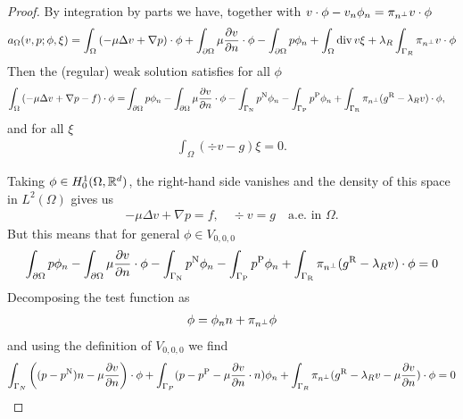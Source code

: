 \begin{proof}
By integration by parts we have, together with $v\cdot\phi - v_n\phi_n=\pi_{n^{\perp}} v\cdot\phi$
%
\begin{align*}
a_{\Omega}(v,p; \phi,\xi) = \int_{\Omega} \left( -\mu \Delta v+\nabla p\right)\cdot\phi + 
\int_{\partial\Omega} \mu\frac{\partial v}{\partial n}\cdot\phi - \int_{\partial\Omega} p\phi_n
+\int_{\Omega} \operatorname{div} v \xi+ \lambda_R\int_{\Gamma_R}\pi_{n^{\perp}} v\cdot\phi
\end{align*}
%
Then the (regular) weak solution satisfies for all $\phi$
%
\begin{align*}
\int_{\Omega} \left( -\mu \Delta v+\nabla p -f\right)\cdot\phi
=& \int_{\partial\Omega} p\phi_n - \int_{\partial\Omega} \mu\frac{\partial v}{\partial n}\cdot\phi -\int_{\Gamma_{\rm N}} p^{\rm N}\phi_n-\int_{\Gamma_{\rm P}} p^{\rm P}\phi_n+ \int_{\Gamma_{\rm R}} \pi_{n^{\perp}}(g^{\rm R} -\lambda_R v)\cdot\phi,
\end{align*}
%
and for all $\xi$
%
\begin{align*}
\int_{\Omega} (\div v-g) \xi = 0.
\end{align*}
%

Taking $\phi \in H^1_0(\Omega,\mathbb R^d)$, the right-hand side vanishes and the density of this space in $L^2(\Omega)$ gives us 
%
\begin{align*}
-\mu \Delta v+\nabla p = f,\quad \div v = g \quad  \mbox{a.e. in $\Omega$}.
\end{align*}
%
But this means that for general $\phi\in V_{0,0,0}$
%
\begin{align*}
\int_{\partial\Omega} p\phi_n - \int_{\partial\Omega} \mu\frac{\partial v}{\partial n}\cdot\phi -\int_{\Gamma_{\rm N}} p^{\rm N}\phi_n -\int_{\Gamma_{\rm P}} p^{\rm P}\phi_n
+ \int_{\Gamma_{\rm R}} \pi_{n^{\perp}}(g^{\rm R} -\lambda_R v)\cdot\phi=0
\end{align*}
%
Decomposing the test function as
%
\begin{align*}
\phi = \phi_n n + \pi_{n^{\perp}}\phi
\end{align*}
%
and using the definition of $V_{0,0,0}$ we find
%
\begin{align*}
\int_{\Gamma_N} \left( (p-p^{\rm N})n - \mu\frac{\partial v}{\partial n}\right)\cdot\phi 
+ \int_{\Gamma_P}  (p-p^{\rm P}- \mu\frac{\partial v}{\partial n}\cdot n)\phi_n 
+ \int_{\Gamma_R} \pi_{n^{\perp}}(g^{\rm R} -\lambda_R v - \mu\frac{\partial v}{\partial n})\cdot\phi =0
\end{align*}
%
\end{proof}
%
